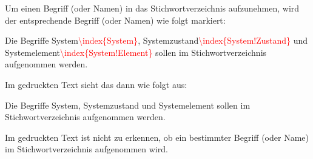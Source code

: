 Um einen Begriff (oder Namen) in das Stichwortverzeichnis aufzunehmen, wird der entsprechende Begriff (oder Namen)  wie folgt markiert:

\begin{tcolorbox}[width=\textwidth,colback={light-gray},title={Latex-Text},colbacktitle=gray,coltitle=white]

Die Begriffe System\textcolor{red}{\textbackslash{index\{System\}}}, Systemzustand\textcolor{red}{\textbackslash{index\{System!Zustand\}}} und Systemelement\textcolor{red}{\textbackslash{index\{System!Element\}}} sollen im Stichwortverzeichnis aufgenommen werden.

\end{tcolorbox}

Im gedruckten Text sieht das dann wie folgt aus:

\begin{tcolorbox}[width=\textwidth,colback={light-gray},title={Print-Text},colbacktitle=gray,coltitle=white]

Die Begriffe System, Systemzustand und Systemelement sollen im Stichwortverzeichnis aufgenommen werden.

\end{tcolorbox}

Im gedruckten Text ist nicht zu erkennen, ob ein bestimmter Begriff (oder Name) im Stichwortverzeichnis aufgenommen wird.
